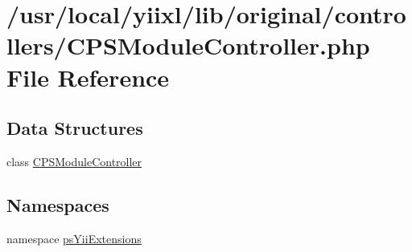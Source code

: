 \hypertarget{CPSModuleController_8php}{
\section{/usr/local/yiixl/lib/original/controllers/CPSModuleController.php File Reference}
\label{CPSModuleController_8php}
}
\subsection*{Data Structures}
\begin{DoxyCompactItemize}
\item 
class \hyperlink{classCPSModuleController}{CPSModuleController}
\end{DoxyCompactItemize}
\subsection*{Namespaces}
\begin{DoxyCompactItemize}
\item 
namespace \hyperlink{namespacepsYiiExtensions}{psYiiExtensions}
\end{DoxyCompactItemize}
